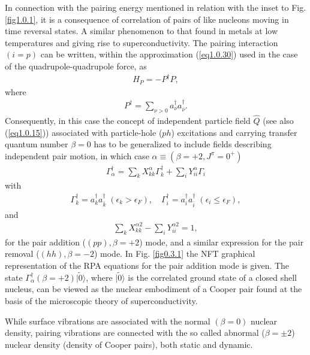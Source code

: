 \documentclass[a4paper,11pt]{book}
\numberwithin{equation}{section}
\numberwithin{figure}{section}
\numberwithin{table}{section}
\newcommand{\ket}[1]{|{#1} \rangle }
\begin{document}
In connection with the pairing energy mentioned in relation with the inset to Fig. \ref{fig1.0.1}, it is a consequence of correlation of pairs of like nucleons moving in time reversal states. A similar phenomenon to that found in metals at low temperatures and giving rise to superconductivity. The pairing interaction $(i=p)$ can be written, within the approximation (\ref{eq1.0.30}) used in the case of the quadrupole-quadrupole force, as 
\begin{align}\label{eq1.0.32}
H_P=- P^\dagger P,
\end{align}
where 
\begin{align}\label{eq1.0.33}
 P^\dagger=\sum_{\nu>0}a^\dagger_\nu a^\dagger_{\bar\nu}.
\end{align}
Consequently, in this case the concept of independent particle field $\hat Q$ (see also (\ref{eq1.0.15})) associated with particle-hole ($ph$) excitations and carrying transfer quantum number $\beta=0$ has to be generalized to include fields describing independent pair motion, in which case $\alpha\equiv(\beta=+2,J^\pi=0^+)$
\begin{align}\label{eq1.0.34}
\Gamma^\dagger_\alpha=\sum_kX^\alpha_{kk}\Gamma_k^\dagger+\sum_iY^\alpha_{ii}\Gamma_i
\end{align}
with 
\begin{align}\label{eq1.0.35}
\Gamma^\dagger_k=a^\dagger_ka^\dagger_{\bar k}\;(\epsilon_k>\epsilon_F),\quad \Gamma^\dagger_i=a^\dagger_ia^\dagger_{\bar i}\;(\epsilon_i\leq\epsilon_F),
\end{align}
and
\begin{align}\label{eq1.0.36}
\sum_kX_{kk}^{\alpha 2}-\sum_i Y_{ii}^{\alpha 2}=1,
\end{align}
for the pair addition ($(pp),\beta=+2$) mode, and a similar expression for the pair removal ($(hh),\beta=-2$) mode. In Fig. \ref{fig0.3.1} the NFT graphical representation of the RPA equations for the pair addition mode is given. The state $\Gamma^\dagger_\alpha(\beta=+2)\ket{\tilde 0}$, where $\ket{\tilde 0}$ is the correlated ground state of a closed shell nucleus, can be viewed as the nuclear embodiment of a Cooper pair found at the basis of the microscopic theory of superconductivity.



While surface vibrations are associated with the normal $(\beta=0)$ nuclear density, pairing vibrations are connected with the so called abnormal ($\beta=\pm2$) nuclear density (density of Cooper pairs), both static and dynamic.
\end{document}
